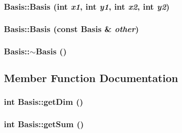 \subsubsection{\setlength{\rightskip}{0pt plus 5cm}Basis::Basis (int {\em x1}, int {\em y1}, int {\em x2}, int {\em y2})\hspace{0.3cm}{\tt  [inline]}}\label{classBasis_0da484bbab015ce28bcb59d7f8b95953}


\subsubsection{\setlength{\rightskip}{0pt plus 5cm}Basis::Basis (const \bf{Basis} \& {\em other})\hspace{0.3cm}{\tt  [inline]}}\label{classBasis_0558cc98db57a399fcef9c48f68819c1}


\subsubsection{\setlength{\rightskip}{0pt plus 5cm}Basis::$\sim$Basis ()\hspace{0.3cm}{\tt  [inline]}}\label{classBasis_80c7722a5ed439f1661d30cb00d20b47}




\subsection{Member Function Documentation}
\subsubsection{\setlength{\rightskip}{0pt plus 5cm}int Basis::get\-Dim ()\hspace{0.3cm}{\tt  [inline]}}\label{classBasis_07459b678687fb613b45080b8f61840c}


\subsubsection{\setlength{\rightskip}{0pt plus 5cm}int Basis::get\-Sum ()\hspace{0.3cm}{\tt  [inline]}}\label{classBasis_14e941584d453a49dc166306b4582b80}


